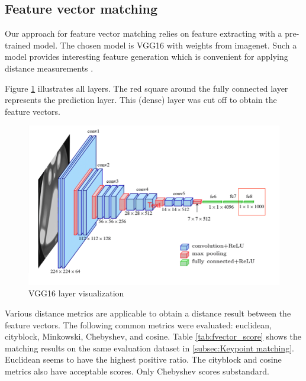 \subsection{Feature vector matching}
\label{subsec:Feature vector matching}

Our approach for feature vector matching relies on feature
extracting with a pre-trained model. The chosen model is
VGG16 with weights from imagenet. Such a model provides
interesting feature generation which is convenient for applying distance measurements \cite{feature_extraction}.

Figure \ref{fig:vgg16} illustrates all layers. The red square around the fully connected layer represents the prediction layer. This (dense) layer was cut off to obtain the feature vectors.

\begin{figure}[htbp]
    \includegraphics[width=1.0\columnwidth]{images/vgg16.png}
    \centering
    \caption{VGG16 layer visualization \cite{vgg16_image}}
    \label{fig:vgg16}
\end{figure}

Various distance metrics are applicable to obtain a distance result between the feature vectors. The following common metrics were evaluated: euclidean, cityblock, Minkowski, Chebyshev, and cosine. Table \ref{tab:fvector_score} shows the matching results on the same evaluation dataset in \ref{subsec:Keypoint matching}. Euclidean seems to have the highest positive ratio. The cityblock and cosine metrics also have acceptable scores. Only Chebyshev scores substandard.


